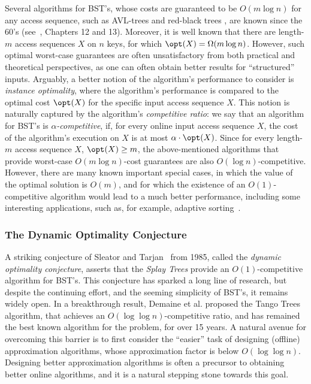 Several algorithms for BST's, whose costs are guaranteed to be $O(m\log n)$ for any access sequence, such as AVL-trees \cite{avl} and red-black trees \cite{Bayer1972}, are known since the 60's (see~\cite{cormen2022introduction}, Chapters 12 and 13). Moreover, it is well known that there are length-$m$ access sequences $X$ on $n$ keys, for which $\opt(X)=\Omega(m\log n)$.
However, such optimal worst-case  guarantees are often unsatisfactory from both practical and theoretical perspectives, as one can often obtain better results for ``structured'' inputs. 
Arguably, a better notion of the algorithm's performance to consider is \emph{instance optimality}, where the algorithm's performance is compared to the optimal cost $\opt(X)$ for the specific input access sequence $X$. This notion is naturally captured by the algorithm's \emph{competitive ratio}:  
%
we say that an algorithm for BST's is \emph{$\alpha$-competitive}, if, for every online input access sequence
$X$, the cost of the algorithm's execution on $X$ is at most $\alpha \cdot \opt(X)$.
Since for every length-$m$ access sequence $X$, $\opt(X)\geq m$, the above-mentioned algorithms that provide worst-case $O(m\log n)$-cost guarantees are also $O(\log n)$-competitive. 
However, there are many known important special cases, in which the value of the optimal solution is $O(m)$, and for which the existence of an $O(1)$-competitive algorithm would lead to a much better performance, including some interesting applications, such as, for example, adaptive sorting~\cite{Tar85,chaudhuri,split_Luc91,deque_Sun92,deque_Elm04,deque_Pet08,DS09,finger1,finger2,BoseDIL14,FOCS15,our_wads,IL-lazy}. 


\subsubsection{The Dynamic Optimality Conjecture} 

A striking conjecture of Sleator and Tarjan~\cite{ST85} from 1985, called the \emph{dynamic optimality conjecture}, asserts that the \emph{Splay Trees} provide an $O(1)$-competitive algorithm for BST's. 
This conjecture has sparked a long line of research, but despite the continuing effort, and the seeming simplicity of BST's, it remains widely open.
In a breakthrough result, Demaine et al. \cite{tango} proposed the Tango Trees algorithm, that achieves an $O(\log\log n)$-competitive ratio, and has remained the best known algorithm for the problem, for over 15 years.   
A natural avenue for overcoming this barrier is to first consider the ``easier'' task of designing (offline) approximation algorithms, whose approximation factor is below $O(\log \log n)$. Designing better approximation algorithms is often a precursor to obtaining better online algorithms, and it is a natural stepping stone towards this goal.  
